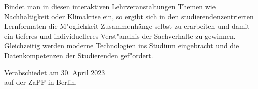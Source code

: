\documentclass[DIV=calc]{scrartcl}
\begin{document}
Bindet man in diesen interaktiven Lehrveranstaltungen Themen wie Nachhaltigkeit oder Klimakrise ein, so ergibt sich in den studierendenzentrierten Lernformaten die M"oglichkeit Zusammenhänge selbst zu erarbeiten und damit ein tieferes und individuelleres Verst"andnis der Sachverhalte zu gewinnen. Gleichzeitig werden moderne Technologien ins Studium eingebracht und die Datenkompetenzen der Studierenden gef"ordert.




\vfill
\begin{flushright}
	Verabschiedet am 30. April 2023 \\
	auf der ZaPF in Berlin.
\end{flushright}
\end{document}
